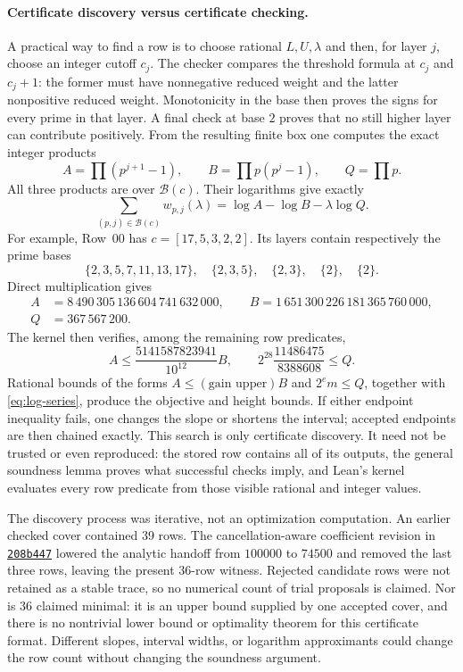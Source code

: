 \documentclass[11pt]{amsart}
\theoremstyle{definition}
\theoremstyle{remark}
\numberwithin{equation}{section}
\newcommand{\repositoryurl}{https://github.com/kimihiro64/Robin1984}
\newcommand{\commitlink}[2]{%
  \href{\repositoryurl/commit/#1}{\texttt{#2}}}
\begin{document}
\paragraph{Certificate discovery versus certificate checking.}
A practical way to find a row is to choose rational $L,U,\lambda$ and then,
for layer $j$, choose an integer cutoff $c_j$.  The checker compares the
threshold formula at $c_j$ and $c_j+1$: the former must have nonnegative
reduced weight and the latter nonpositive reduced weight.  Monotonicity in
the base then proves the signs for every prime in that layer.  A final check
at base $2$ proves that no still higher layer can contribute positively.
From the resulting finite box one computes the exact integer products
\[
A=\prod(p^{j+1}-1),\qquad
B=\prod p(p^j-1),\qquad
Q=\prod p.
\]
All three products are over $\mathcal B(c)$.  Their logarithms give exactly
\[
\sum_{(p,j)\in\mathcal B(c)}w_{p,j}(\lambda)
 =\log A-\log B-\lambda\log Q.
\]
For example, Row~00 has $c=[17,5,3,2,2]$.  Its layers contain respectively
the prime bases
\[
 \{2,3,5,7,11,13,17\},\quad \{2,3,5\},\quad
 \{2,3\},\quad \{2\},\quad \{2\}.
\]
Direct multiplication gives
\begin{align*}
 A&=8\,490\,305\,136\,604\,741\,632\,000,\qquad
 B=1\,651\,300\,226\,181\,365\,760\,000,\\
 Q&=367\,567\,200.
\end{align*}
The kernel then verifies, among the remaining row predicates,
\[
 A\le\frac{5141587823941}{10^{12}}B,
 \qquad
 2^{28}\frac{11486475}{8388608}\le Q.
\]
Rational bounds of the forms $A\le(\text{gain upper})B$ and
$2^e m\le Q$, together with \eqref{eq:log-series}, produce the objective and
height bounds.  If either endpoint inequality fails, one changes the slope
or shortens the interval; accepted endpoints are then chained exactly.
This search is only certificate discovery.  It need not be trusted or even
reproduced: the stored row contains all of its outputs, the general soundness
lemma proves what successful checks imply, and Lean's kernel evaluates every
row predicate from those visible rational and integer values.

The discovery process was iterative, not an optimization computation.  An
earlier checked cover contained 39 rows.  The cancellation-aware coefficient
revision in \commitlink{208b44750090b7b0e2254e3d511b4d119052cd03}{208b447}
lowered the analytic handoff from $100000$ to $74500$ and removed the last
three rows, leaving the present 36-row witness.  Rejected candidate rows were
not retained as a stable trace, so no numerical count of trial proposals is
claimed.  Nor is 36 claimed minimal: it is an upper bound supplied by one
accepted cover, and there is no nontrivial lower bound or optimality theorem
for this certificate format.  Different slopes, interval widths, or
logarithm approximants could change the row count without changing the
soundness argument.
\end{document}
